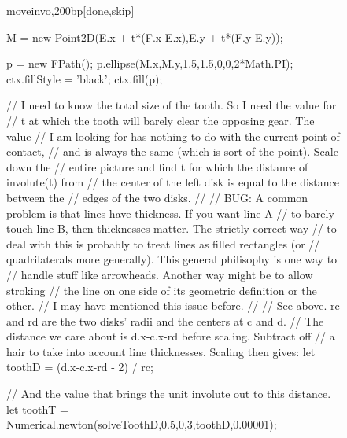 \documentclass[10pt]{article}
\begin{document}
\begin{figure}[b!]
\begin{figput}{moveinvo,200bp}[done,skip]
{  M = new Point2D(E.x + t*(F.x-E.x),E.y + t*(F.y-E.y));

  p = new FPath();
  p.ellipse(M.x,M.y,1.5,1.5,0,0,2*Math.PI);
  ctx.fillStyle = 'black';
  ctx.fill(p);

  // I need to know the total size of the tooth. So I need the value for
  // t at which the tooth will barely clear the opposing gear. The value
  // I am looking for has nothing to do with the current point of contact,
  // and is always the same (which is sort of the point). Scale down the
  // entire picture and find t for which the distance of involute(t) from
  // the center of the left disk is equal to the distance between the
  // edges of the two disks.
  //
  // BUG: A common problem is that lines have thickness. If you want line A
  // to barely touch line B, then thicknesses matter. The strictly correct way
  // to deal with this is probably to treat lines as filled rectangles (or
  // quadrilaterals more generally). This general philisophy is one way to
  // handle stuff like arrowheads. Another way might be to allow stroking
  // the line on one side of its geometric definition or the other.
  // I may have mentioned this issue before.
  // 
  // See above. rc and rd are the two disks' radii and the centers at c and d.
  // The distance we care about is d.x-c.x-rd before scaling. Subtract off
  // a hair to take into account line thicknesses. Scaling then gives:
  let toothD = (d.x-c.x-rd - 2) / rc;

  // And the value that brings the unit involute out to this distance.
  let toothT = Numerical.newton(solveToothD,0.5,0,3,toothD,0.00001);

}
\end{figput}
\end{figure}
\end{document}
